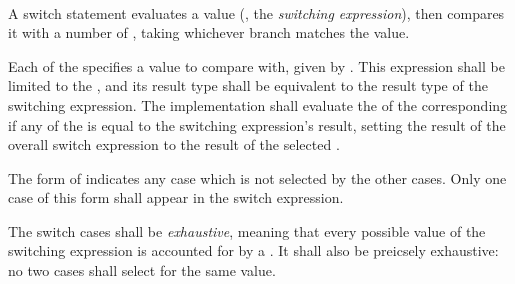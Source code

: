 
\begin{grammar}
 \\
	 \terminal{(}  \terminal{)} \terminal{\{}  \terminal{\}} \\

 \\
	 \optional{\terminal{,}} \\
	 \terminal{,}  \\

 \\
	 \terminal{=>}  \\
	\terminal{*} \terminal{=>}  \\

 \\
	 \optional{\terminal{,}} \\
	 \terminal{,}  \\
\end{grammar}

\specsubsubitem
A switch statement evaluates a value (, the
\textit{switching expression}), then compares it with a number of
, taking whichever branch matches the value.

\specsubsubitem
Each of the  specifies a value to compare with, given
by . This expression shall be limited to the
, and its result type shall be
equivalent to the result type of the switching expression. The implementation
shall evaluate the  of the corresponding
 if any of the  is equal to
the switching expression's result, setting the result of the overall switch
expression to the result of the selected .

\specsubsubitem
The \terminal{*} form of  indicates any case which is
not selected by the other cases. Only one case of this form shall appear in the
switch expression.

\specsubsubitem
The switch cases shall be \textit{exhaustive}, meaning that every possible
value of the switching expression is accounted for by a
. It shall also be preicsely exhaustive: no two cases
shall select for the same value.

